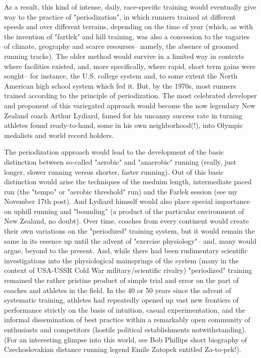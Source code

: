 As a result, this kind of intense, daily, race-specific training would eventually give way to the practice of "periodization", in which runners trained at different speeds and over different terrains, depending on the time of year (which, as with the invention of "fartlek" and hill training, was also a concession to the vagaries of climate, geography and scarce resourses-- namely, the absence of groomed running tracks). The older method would survive in a limited way in contexts where facilities existed, and, more specifically, where rapid, short term gains were sought-- for instance, the U.S. college system and, to some extent the North American high school system which fed it. But, by the 1970s, most runners trained according to the principle of periodization. The most celebrated developer and proponent of this variegated approach would become the now legendary New Zealand coach Arthur Lydiard, famed for his uncanny success rate in turning athletes found ready-to-hand, some in his own neighborhood(!), into Olympic medalists and world record holders.

The periodization approach would lead to the development of the basic distinction between so-called "aerobic" and "anaerobic" running (really, just longer, slower running versus shorter, faster running). Out of this basic distinction would arise the techniques of the meduim length, intermediate paced run (the "tempo" or "aerobic threshold" run) and the Farlek session (see my November 17th post). And Lydiard himself would also place special importance on uphill running and "bounding" (a product of the particular environment of New Zealand, no doubt). Over time, coaches from every continent would create their own variations on the "periodized" training system, but it would remain the same in its essence up until the advent of "exercise physiology"-- and, many would argue, beyond to the present. And, while there had been rudimentary scientific investigations into the physiological mainsprings of the system (many in the context of USA-USSR Cold War military/scientific rivalry) "periodized" training remained the rather pristine product of simple trial and error on the part of coaches and athletes in the field. In the 40 or 50 years since the advent of systematic training, athletes had repeatedly opened up vast new frontiers of performance strictly on the basis of intuition, casual experimentation, and the informal dissemination of best practice within a remarkably open community of enthusiasts and competitors (hostile political establishments notwithstanding). (For an interesting glimpse into this world, see Bob Phillips short biography of Czechoslovakian distance running legend Emile Zatopek entitled Za-to-pek!).

